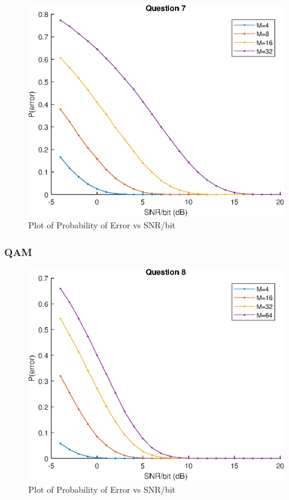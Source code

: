 \documentclass[12pt]{report}
\begin{document}
\begin{figure}[!htb]
    \begin{center}
    \includegraphics[scale=1]{Question7}
    \caption{Plot of Probability of Error vs SNR/bit}
    \end{center}
\end{figure}

\newpage

\subsubsection{QAM}

\begin{figure}[!htb]
    \begin{center}
    \includegraphics[scale=1]{Question8}
    \caption{Plot of Probability of Error vs SNR/bit}
    \end{center}
\end{figure}
\end{document}
